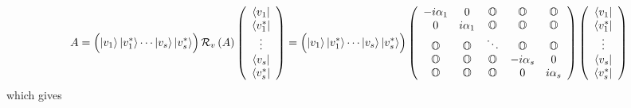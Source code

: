 \[
A=\left( \stackrel{}{\left\vert v_{1}\right\rangle \left\vert v_{1}^{\ast
}\right\rangle \cdots \left\vert v_{s}\right\rangle \left\vert v_{s}^{\ast
}\right\rangle }\right) {\cal R}_{v}\left( A\right) \left( 
\begin{array}{c}
\left\langle v_{1}\right\vert \\ 
\left\langle v_{1}^{\ast }\right\vert \\ 
\vdots \\ 
\left\langle v_{s}\right\vert \\ 
\left\langle v_{s}^{\ast }\right\vert%
\end{array}%
\right) =\left( \stackrel{}{\left\vert v_{1}\right\rangle \left\vert
v_{1}^{\ast }\right\rangle \cdots \left\vert v_{s}\right\rangle \left\vert
v_{s}^{\ast }\right\rangle }\right) \left( 
\begin{array}{ccccc}
-i\alpha _{1} & 0 & {\Bbb O} & {\Bbb O} & {\Bbb O} \\ 
0 & i\alpha _{1} & {\Bbb O} & {\Bbb O} & {\Bbb O} \\ 
{\Bbb O} & {\Bbb O} & \ddots & {\Bbb O} & {\Bbb O} \\ 
{\Bbb O} & {\Bbb O} & {\Bbb O} & -i\alpha _{s} & 0 \\ 
{\Bbb O} & {\Bbb O} & {\Bbb O} & 0 & i\alpha _{s}%
\end{array}%
\right) \left( 
\begin{array}{c}
\left\langle v_{1}\right\vert \\ 
\left\langle v_{1}^{\ast }\right\vert \\ 
\vdots \\ 
\left\langle v_{s}\right\vert \\ 
\left\langle v_{s}^{\ast }\right\vert%
\end{array}%
\right) 
\]%
which gives 
